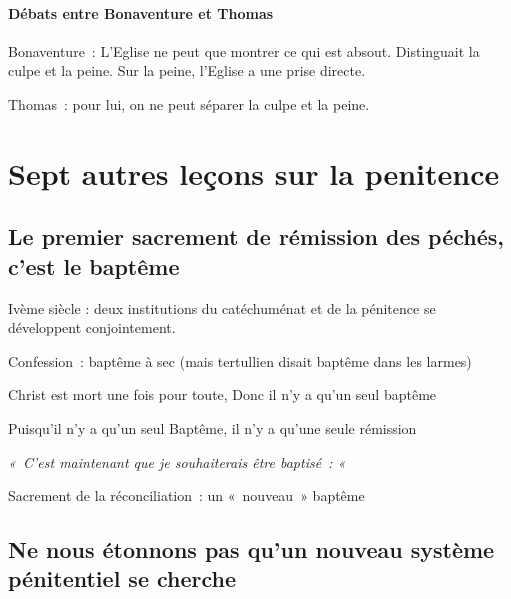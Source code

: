 \hypertarget{duxe9bats-entre-bonaventure-et-thomas}{%
\paragraph{Débats entre Bonaventure et
Thomas}\label{duxe9bats-entre-bonaventure-et-thomas}}

Bonaventure~: L'Eglise ne peut que montrer ce qui est absout.
Distinguait la culpe et la peine. Sur la peine, l'Eglise a une prise
directe.

Thomas~: pour lui, on ne peut séparer la culpe et la peine.

\hypertarget{sept-autres-leuxe7ons-sur-la-penitence}{%
\section{\texorpdfstring{Sept autres leçons sur la penitence
}{Sept autres leçons sur la penitence }}\label{sept-autres-leuxe7ons-sur-la-penitence}}

\hypertarget{le-premier-sacrement-de-ruxe9mission-des-puxe9chuxe9s-cest-le-baptuxeame}{%
\subsection{Le premier sacrement de rémission des péchés, c'est le
baptême}\label{le-premier-sacrement-de-ruxe9mission-des-puxe9chuxe9s-cest-le-baptuxeame}}

Ivème siècle : deux institutions du catéchuménat et de la pénitence se
développent conjointement.

Confession~: baptême à sec (mais tertullien disait baptême dans les
larmes)

Christ est mort une fois pour toute, Donc il n'y a qu'un seul baptême

Puisqu'il n'y a qu'un seul Baptême, il n'y a qu'une seule rémission

\emph{«~C'est maintenant que je souhaiterais être baptisé~: «~}

Sacrement de la réconciliation~: un «~nouveau~» baptême

\hypertarget{ne-nous-uxe9tonnons-pas-quun-nouveau-systuxe8me-puxe9nitentiel-se-cherche}{%
\subsection{Ne nous étonnons pas qu'un nouveau système pénitentiel se
cherche}\label{ne-nous-uxe9tonnons-pas-quun-nouveau-systuxe8me-puxe9nitentiel-se-cherche}}

